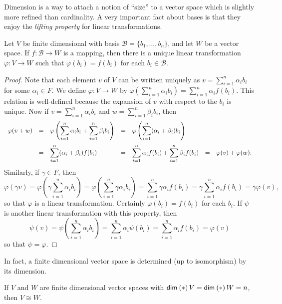 \documentclass{memoir}
\begin{document}
Dimension is a way to attach a notion of ``size'' to a vector space which is slightly more refined than cardinality. A very important fact about bases is that they enjoy the \emph{lifting property} for linear transformations.

\begin{prp}
Let $V$ be finite dimensional with basis $\mathcal{B} = \{b_1,\ldots,b_n\}$, and let $W$ be a vector space. If $f : \mathcal{B} \rightarrow W$ is a mapping, then there is a unique linear transformation $\varphi : V \rightarrow W$ such that $\varphi(b_i) = f(b_i)$ for each $b_i \in \mathcal{B}$.
\end{prp}

\begin{proof}
Note that each element $v$ of $V$ can be written uniquely as $v = \sum_{i=1}^n \alpha_i b_i$ for some $\alpha_i \in F$. We define $\varphi : V \rightarrow W$ by $\varphi(\sum_{i=1}^n \alpha_i b_i) = \sum_{i=1}^n \alpha_i f(b_i)$. This relation is well-defined because the expansion of $v$ with respect to the $b_i$ is unique. Now if $v = \sum_{i=1}^n \alpha_i b_i$ and $w = \sum_{i=1}^n \beta_i b_i$, then 
\[\begin{array}{lclclcl} 
\varphi(v+w) & = & \varphi\left(\displaystyle\sum_{i=1}^n \alpha_i b_i + \displaystyle\sum_{i=1}^n \beta_i b_i\right) & = & \varphi\left(\displaystyle\sum_{i=1}^n (\alpha_i + \beta_i)b_i\right) & \vspace{0.2cm} & \\
 & = & \displaystyle\sum_{i=1}^n (\alpha_i+\beta_i)f(b_i) & = & \displaystyle\sum_{i=1}^n \alpha_i f(b_i) + \displaystyle\sum_{i=1}^n \beta_i f(b_i) & = & \varphi(v) + \varphi(w).
\end{array} \]
Similarly, if $\gamma \in F$, then \[ \varphi(\gamma v) = \varphi\left(\gamma \sum_{i=1}^n \alpha_i b_i \right) = \varphi\left(\sum_{i=1}^n \gamma\alpha_i b_i \right) = \sum_{i=1}^n \gamma\alpha_i f(b_i) = \gamma \sum_{i=1}^n \alpha_i f(b_i) = \gamma \varphi(v), \] so that $\varphi$ is a linear transformation. Certainly $\varphi(b_i) = f(b_i)$ for each $b_i$. If $\psi$ is another linear transformation with this property, then \[\psi(v) = \psi\left(\sum_{i=1}^n \alpha_i b_i\right) = \sum_{i=1}^n \alpha_i \psi(b_i) = \sum_{i=1}^n \alpha_i f(b_i) = \varphi(v)\] so that $\psi = \varphi$.
\end{proof}

In fact, a finite dimensional vector space is determined (up to isomorphism) by its dimension.

\begin{prp}
If $V$ and $W$ are finite dimensional vector spaces with $\operatorname{\mathsf{dim}}_{}\left(*\right){V} = \operatorname{\mathsf{dim}}_{}\left(*\right){W} = n$, then $V \cong W$.
\end{prp}
\end{document}
